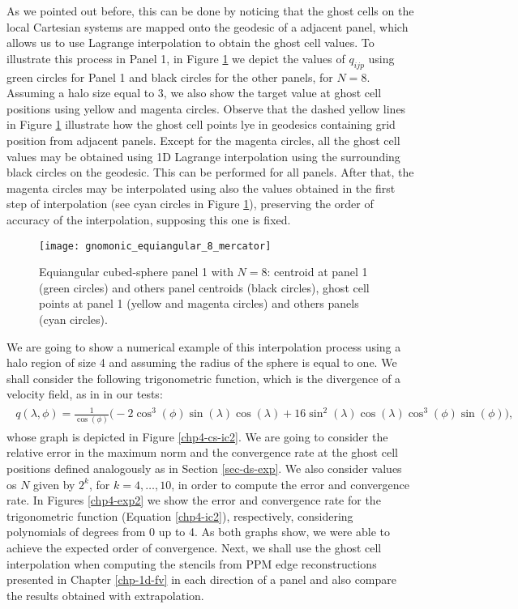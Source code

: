 As we pointed out before, this can be done by noticing that the ghost cells on the local
Cartesian systems are mapped onto the geodesic of a adjacent panel, which allows us to use Lagrange interpolation to obtain the ghost cell values.
To illustrate this process in Panel 1, in Figure \ref{chp4-cs-halodata} we depict the values of $q_{ijp}$ using green circles for Panel 1 and black circles for the other panels, for $N=8$. Assuming a halo size equal to 3, we also show the target value at ghost cell positions using yellow and magenta circles. Observe that the dashed yellow lines in Figure \ref{chp4-cs-halodata} illustrate
how the ghost cell points lye in geodesics containing grid position from adjacent panels. Except for the magenta circles,
all the ghost cell values may be obtained using 1D Lagrange interpolation using the surrounding black circles on the geodesic.
This can be performed for all panels. After that, the magenta circles may be interpolated using also the values obtained in the first step of interpolation
(see cyan circles in Figure \ref{chp4-cs-halodata}), preserving the order of accuracy of the interpolation, supposing this one is fixed. 
\begin{figure}[!htb]
	\centering
	\texttt{[image: gnomonic\_equiangular\_8\_mercator]}
	\caption{Equiangular cubed-sphere panel 1 with $N=8$: 
	centroid at panel 1 (green circles) and others panel centroids (black circles), 
	ghost cell points at panel 1 (yellow and magenta circles) and others panels (cyan circles).}
	\label{chp4-cs-halodata}
\end{figure}

We are going to show a numerical example of this interpolation process using a halo region of size 4 and 
assuming the radius of the sphere is equal to one.
We shall consider the following trigonometric function, which is the divergence of a velocity field,
as in \citet{peixoto:13} in our tests:
\begin{align}
	\label{chp4-ic2}
	\begin{split}
	q(\lambda, \phi) = \frac{1}{\cos(\phi)}\bigg(-2\cos^3(\phi) \sin(\lambda) \cos(\lambda)
	+16\sin^2(\lambda)\cos(\lambda)\cos^3(\phi)\sin(\phi)\bigg),
	\end{split}
\end{align}
whose graph is depicted in Figure \ref{chp4-cs-ic2}. We are going to consider the relative error in the maximum norm and the convergence rate 
at the ghost cell positions defined analogously as in Section \ref{sec-ds-exp}. 
We also consider values os $N$ given by $2^k$, for $k=4, \ldots, 10$, in order to compute the error and convergence rate.
In Figures \ref{chp4-exp2} we show the error and convergence rate for the trigonometric function (Equation \eqref{chp4-ic2}),
respectively, considering polynomials of degrees from 0 up to 4. As both graphs show, we were able to achieve the expected order of convergence.
Next, we shall use the ghost cell interpolation when computing the stencils from PPM edge reconstructions presented in Chapter \ref{chp-1d-fv}
in each direction of a panel and also compare the results obtained with extrapolation.


